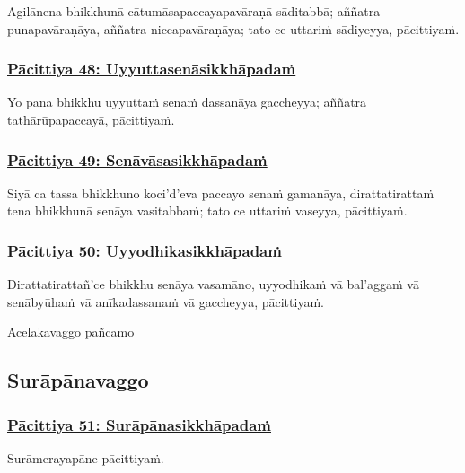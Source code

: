 Agilānena bhikkhunā cātumāsapaccayapavāraṇā sāditabbā; aññatra punapavāraṇāya, aññatra niccapavāraṇāya; tato ce uttariṁ sādiyeyya, pācittiyaṁ.



\subsubsection*{\hyperref[exp48]{Pācittiya 48: Uyyuttasenāsikkhāpadaṁ}}
\label{pac48}

Yo pana bhikkhu uyyuttaṁ senaṁ dassanāya gaccheyya; aññatra tathārūpapaccayā, pācittiyaṁ.



\subsubsection*{\hyperref[exp49]{Pācittiya 49: Senāvāsasikkhāpadaṁ}}
\label{pac49}

Siyā ca tassa bhikkhuno koci'd'eva paccayo senaṁ gamanāya, dirattatirattaṁ tena bhikkhunā senāya vasitabbaṁ; tato ce uttariṁ vaseyya, pācittiyaṁ.



\subsubsection*{\hyperref[exp50]{Pācittiya 50: Uyyodhikasikkhāpadaṁ}}
\label{pac50}

Dirattatirattañ'ce bhikkhu senāya vasamāno, uyyodhikaṁ vā bal'aggaṁ vā senābyūhaṁ vā anīkadassanaṁ vā gaccheyya, pācittiyaṁ.

\begin{center}
	Acelakavaggo pañcamo
\end{center}



\subsection{Surāpānavaggo}

\subsubsection*{\hyperref[exp51]{Pācittiya 51: Surāpānasikkhāpadaṁ}}
\label{pac51}

Surāmerayapāne pācittiyaṁ.



